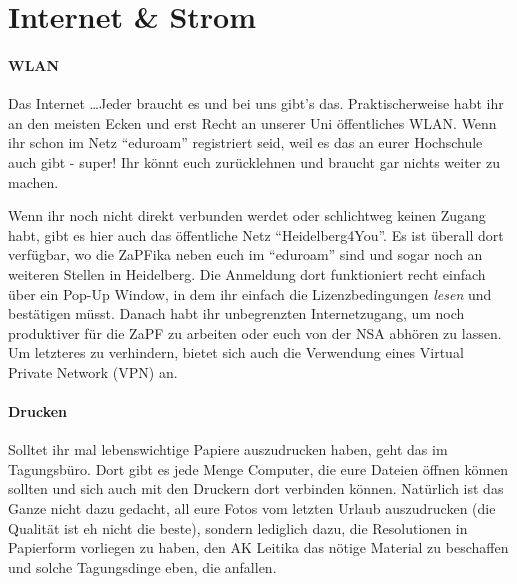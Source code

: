 
\section{Internet \& Strom}
\paragraph{WLAN}
Das Internet \dots Jeder braucht es und bei uns gibt's das. Praktischerweise habt ihr an den meisten Ecken und erst Recht an unserer Uni öffentliches WLAN. Wenn ihr schon im Netz ``eduroam'' registriert seid, weil es das an eurer Hochschule auch gibt - super! Ihr könnt euch zurücklehnen und braucht gar nichts weiter zu machen.

Wenn ihr noch nicht direkt verbunden werdet oder schlichtweg keinen Zugang habt, gibt es hier auch das öffentliche Netz ``Heidelberg4You''. Es ist überall dort verfügbar, wo die ZaPFika neben euch im ``eduroam'' sind und sogar noch an weiteren Stellen in Heidelberg. Die Anmeldung dort funktioniert recht einfach über ein Pop-Up Window, in dem ihr einfach die Lizenzbedingungen \textit{lesen} und bestätigen müsst. Danach habt ihr unbegrenzten Internetzugang, um noch produktiver für die ZaPF zu arbeiten oder euch von der NSA abhören zu lassen. Um letzteres zu verhindern, bietet sich auch die Verwendung eines Virtual Private Network (VPN) an.

\paragraph{Drucken}
Solltet ihr mal lebenswichtige Papiere auszudrucken haben, geht das im Tagungsbüro. Dort gibt es jede Menge Computer, die eure Dateien öffnen können sollten und sich auch mit den Druckern dort verbinden können. Natürlich ist das Ganze nicht dazu gedacht, all eure Fotos vom letzten Urlaub auszudrucken (die Qualität ist eh nicht die beste), sondern lediglich dazu, die Resolutionen in Papierform vorliegen zu haben, den AK Leitika das nötige Material zu beschaffen und solche Tagungsdinge eben, die anfallen.

